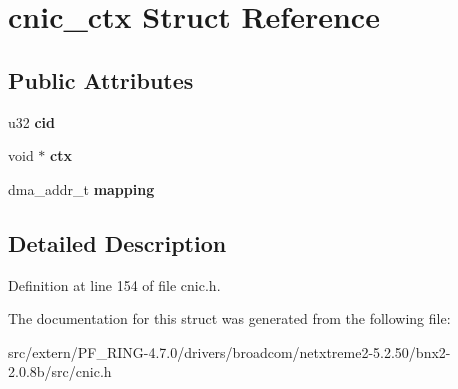 \hypertarget{structcnic__ctx}{
\section{cnic\_\-ctx Struct Reference}
\label{structcnic__ctx}
}
\subsection*{Public Attributes}
\begin{DoxyCompactItemize}
\item 
\hypertarget{structcnic__ctx_a79bc5f7940ae12c3c0f1e33fe7124166}{
u32 {\bfseries cid}}
\label{structcnic__ctx_a79bc5f7940ae12c3c0f1e33fe7124166}

\item 
\hypertarget{structcnic__ctx_a5bc663532f8f746bd2c8ae7b2548c19b}{
void $\ast$ {\bfseries ctx}}
\label{structcnic__ctx_a5bc663532f8f746bd2c8ae7b2548c19b}

\item 
\hypertarget{structcnic__ctx_aa1386ad091ee72e07869cf7917e3e54f}{
dma\_\-addr\_\-t {\bfseries mapping}}
\label{structcnic__ctx_aa1386ad091ee72e07869cf7917e3e54f}

\end{DoxyCompactItemize}


\subsection{Detailed Description}


Definition at line 154 of file cnic.h.



The documentation for this struct was generated from the following file:\begin{DoxyCompactItemize}
\item 
src/extern/PF\_\-RING-\/4.7.0/drivers/broadcom/netxtreme2-\/5.2.50/bnx2-\/2.0.8b/src/cnic.h\end{DoxyCompactItemize}
